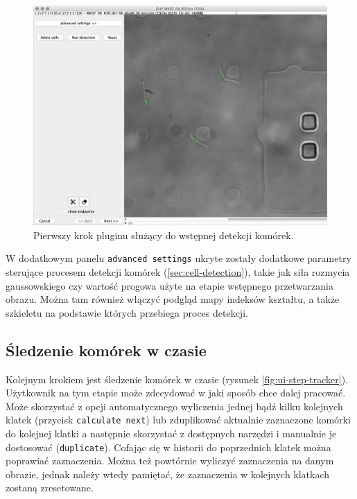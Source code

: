 \documentclass[declaration,shortabstract,mgr]{iithesis}
\begin{document}
\begin{figure}
  \centering
  \includegraphics[width=\textwidth]{images/ui-step-detector.png}
  \caption{Pierwszy krok pluginu służący do wstępnej detekcji komórek.}
  \label{fig:ui-step-detector}
\end{figure}

W dodatkowym panelu \texttt{advanced settings} ukryte zostały dodatkowe parametry sterujące procesem detekcji komórek (\ref{sec:cell-detection}), takie jak siła rozmycia gaussowskiego czy wartość progowa użyte na etapie wstępnego przetwarzania obrazu.
Można tam również włączyć podgląd mapy indeksów kształtu, a także szkieletu na podstawie których przebiega proces detekcji.

\subsection{Śledzenie komórek w czasie}

Kolejnym krokiem jest śledzenie komórek w czasie (rysunek \ref{fig:ui-step-tracker}).
Użytkownik na tym etapie może zdecydować w jaki sposób chce dalej pracować.
Może skorzystać z opcji automatycznego wyliczenia jednej bądź kilku kolejnych klatek (przycisk \texttt{calculate next}) lub zduplikować aktualnie zaznaczone komórki do kolejnej klatki a następnie skorzystać z dostępnych narzędzi i manualnie je dostosować (\texttt{duplicate}).
Cofając się w historii do poprzednich klatek można poprawiać zaznaczenia. Można też powtórnie wyliczyć zaznaczenia na danym obrazie, jednak należy wtedy pamiętać, że zaznaczenia w kolejnych klatkach zostaną zresetowane.
\end{document}
